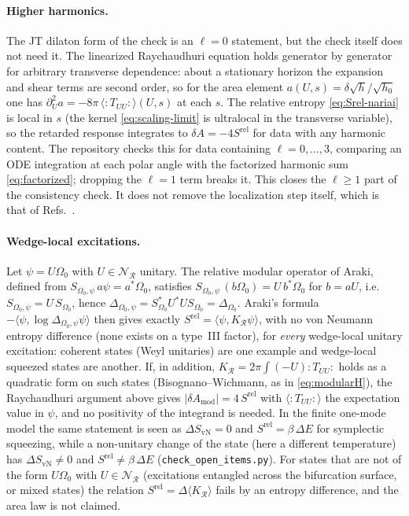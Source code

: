 \documentclass[11pt]{article}
\newcommand{\Srel}{S^{\mathrm{rel}}}
\begin{document}
\paragraph{Higher harmonics.} The JT dilaton form of the check is an $\ell=0$ statement, but the check itself does not need it. The linearized Raychaudhuri equation holds generator by generator for arbitrary transverse dependence: about a stationary horizon the expansion and shear terms are second order, so for the area element $a(U,s)=\delta\sqrt h/\sqrt{h_0}$ one has $\partial_U^2 a=-8\pi\,\langle{:}T_{UU}{:}\rangle(U,s)$ at each $s$. The relative entropy \eqref{eq:Srel-nariai} is local in $s$ (the kernel \eqref{eq:scaling-limit} is ultralocal in the transverse variable), so the retarded response integrates to $\delta A=-4\Srel$ for data with any harmonic content. The repository checks this for data containing $\ell=0,\dots,3$, comparing an ODE integration at each polar angle with the factorized harmonic sum \eqref{eq:factorized}; dropping the $\ell=1$ term breaks it. This closes the $\ell\ge1$ part of the consistency check. It does not remove the localization step itself, which is that of Refs.~\cite{Jacobson,DorauMuch}.

\paragraph{Wedge-local excitations.} Let $\psi=U\Omega_0$ with $U\in\mathscr N_{\mathcal R}$ unitary. The relative modular operator of Araki, defined from $S_{\Omega_0,\psi}\,a\psi=a^*\Omega_0$, satisfies $S_{\Omega_0,\psi}\,(b\Omega_0)=U\,b^*\Omega_0$ for $b=aU$, i.e.\ $S_{\Omega_0,\psi}=U\,S_{\Omega_0}$, hence $\Delta_{\Omega_0,\psi}=S_{\Omega_0}^*U^*US_{\Omega_0}=\Delta_{\Omega_0}$. Araki's formula $-\langle\psi,\log\Delta_{\Omega_0,\psi}\psi\rangle$ then gives exactly $\Srel=\langle\psi,K_{\mathcal R}\psi\rangle$, with no von Neumann entropy difference (none exists on a type~III factor), for \emph{every} wedge-local unitary excitation: coherent states (Weyl unitaries) are one example and wedge-local squeezed states are another. If, in addition, $K_{\mathcal R}=2\pi\int(-U){:}T_{UU}{:}$ holds as a quadratic form on such states (Bisognano--Wichmann, as in \eqref{eq:modularH}), the Raychaudhuri argument above gives $|\delta A_{\mathrm{mod}}|=4\,\Srel$ with $\langle{:}T_{UU}{:}\rangle$ the expectation value in $\psi$, and no positivity of the integrand is needed. In the finite one-mode model the same statement is seen as $\Delta S_{\mathrm{vN}}=0$ and $\Srel=\beta\,\Delta E$ for symplectic squeezing, while a non-unitary change of the state (here a different temperature) has $\Delta S_{\mathrm{vN}}\neq0$ and $\Srel\neq\beta\,\Delta E$ (\texttt{check\_open\_items.py}). For states that are not of the form $U\Omega_0$ with $U\in\mathscr N_{\mathcal R}$ (excitations entangled across the bifurcation surface, or mixed states) the relation $\Srel=\Delta\langle K_{\mathcal R}\rangle$ fails by an entropy difference, and the area law is not claimed.
\end{document}
